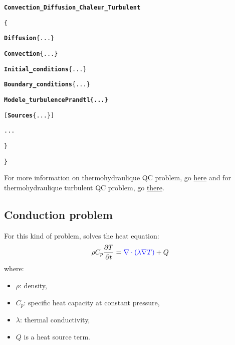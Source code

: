 \begin{center}
{\begin{minipage}[c]{0.95\textwidth}
\begin{alltt}
\hspace{1cm}    {\bf{Convection\_Diffusion\_Chaleur}\textcolor{Greeen}{\_Turbulent}}

\hspace{1cm}    \{

\hspace{2cm}        {\bf{Diffusion}} \{ ... \}

\hspace{2cm}        {\bf{Convection}} \{ ... \}

\hspace{2cm}        {\bf{Initial\_conditions}} \{ ... \}

\hspace{2cm}        {\bf{Boundary\_conditions}} \{ ... \}

\hspace{2cm}        {\bf{\textcolor{Greeen}{Modele\_turbulence Prandtl \{ ... \} } }}

\hspace{2cm}        [{\bf{Sources}} \{ ... \}]

\hspace{2cm}        ...

\hspace{1cm}    \}

\}
\end{alltt}
\end{minipage}}
\end{center}

For more information on thermohydraulique QC problem, go \href{TRUST_Reference_Manual.pdf\#pbthermohydrauliqueqc}{here} and for thermohydraulique turbulent QC problem, go \href{TRUST_Reference_Manual.pdf\#pbthermohydrauliqueturbulentqc}{there}.



\subsection{Conduction problem}
For this kind of problem, \trust solves the heat equation:
$$
\rho C_p \frac{\partial T}{\partial t} = \textcolor{blue}{\nabla \cdot \left(\lambda \nabla T\right)} + Q
$$
where:
\begin{itemize}
\item $\rho$: density,
\item $C_p$: specific heat capacity at constant pressure,
\item $\lambda$: thermal conductivity,
\item $Q$ is a heat source term.
\end{itemize}

